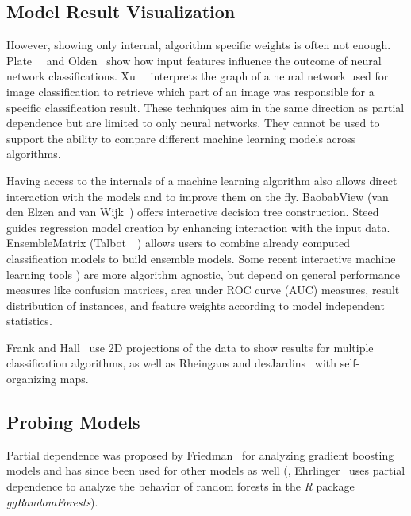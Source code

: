 \subsection{Model Result Visualization}
However, showing only internal, algorithm specific weights is often not enough.
Plate~\etal~\cite{DBLP:journals/neco/PlateBGB00} and Olden~\cite{citeulike:3733836} show how input features influence
the outcome of neural network classifications.
Xu~\etal~\cite{DBLP:journals/corr/XuBKCCSZB15} interprets
the graph of a neural network used for image classification to
retrieve which part of an image was responsible for a specific
classification result.
These techniques aim in the same direction as partial dependence but are limited to only neural networks.
They cannot be used to support the ability to compare different machine learning models across algorithms.

Having access to the internals of a machine learning algorithm also allows direct interaction with the models and to improve them on the fly.
BaobabView (van den Elzen and van Wijk~\cite{van2011baobabview}) offers interactive decision tree construction.
Steed~\etal~\cite{steed2009guided,steed2009tropical}
guides regression model creation by enhancing interaction
with the input data.
EnsembleMatrix (Talbot~\etal~\cite{Talbot:2009:EIV:1518701.1518895})
allows users to combine already computed classification models to
build ensemble models.
Some recent interactive machine learning tools \cite{
amershi15,
Amershi:2011:DEE:2046396.2046416,
Amershi:2012:RIM:2207676.2207680,
Amershi:2011:CHF:1978942.1978966,
Kapoor:2010:IOS:1753326.1753529,
kim2015scalable,
Leung2014710,
Mishra:2015:SAI:2700171.2791022,
export:141330})
are more algorithm agnostic, but depend on general
performance measures like confusion matrices,
area under ROC curve (AUC) measures,
result distribution of instances, and
feature weights according to model independent statistics.

Frank and Hall~\cite{frank2003} use 2D projections of the data to show %
results for multiple classification algorithms, as well as Rheingans and desJardins~\cite{885740} with self-organizing maps.

\subsection{Probing Models}
Partial dependence was proposed by Friedman~\cite{friedman2001} for analyzing
gradient boosting models and has since been used for other models as well (\eg, Ehrlinger~\cite{ehrlinger2015} uses partial dependence to analyze the behavior of random forests
in the \emph{R} package \emph{ggRandomForests}).

